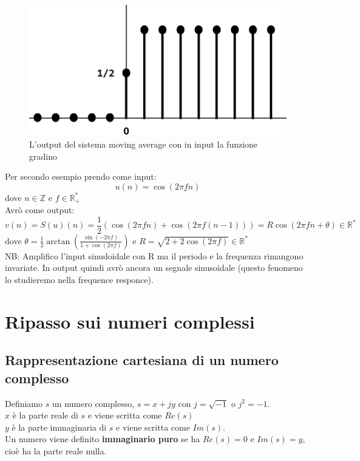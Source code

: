 \begin{figure}[h]
	\centering
	\includegraphics[scale=0.5]{immagini/gradinoMedia}
	\caption{ L'output del sistema moving average con in input la funzione gradino}
	\label{fig: Output sistema moving average gradino}
\end{figure}
Per secondo esempio prendo come input:
\begin{equation*}
u(n)= \cos(2\pi f n)
\end{equation*}
dove $n \in \mathbb{Z} $ e $f \in \mathbb{R}_{+}^{*}$\\
Avrò come output:
\begin{equation*}
v(n)= S(u)(n) = \frac{1}{2} (\cos(2\pi f n) + \cos(2\pi f (n-1))) = R\cos( 2\pi f n + \theta) \in \mathbb{R}^{*}
\end{equation*}
dove $\theta = \frac{1}{2} \arctan(\frac{ \sin (-2\pi f)    }{1+\cos(2\pi f)})$ e $ R = \sqrt{ 2+2\cos(2\pi f)} \in \mathbb{R}^{*}$\\
NB: Amplifico l'input sinudoidale con R ma il periodo e la frequenza rimangono invariate. In output quindi avrò ancora un segnale sinusoidale (questo fenomeno lo studieremo nella frequence responce).

\pagebreak

\section{ Ripasso sui numeri complessi }

\subsection*{Rappresentazione cartesiana di un numero complesso}
Definiamo $s$ un numero complesso, $ s = x+jy$ con $j=\sqrt{-1}$ o $j^{2} = -1$.\\
$x$ è la parte reale di $s$ e viene scritta come $Re(s)$ \\
$y$ è la parte immaginaria di $s$ e viene scritta come $Im(s)$.\\
Un numero viene definito \textbf{ immaginario puro} se ha $ Re(s) = 0 $ e $ Im(s) = y $, cioè ha la parte reale nulla.

